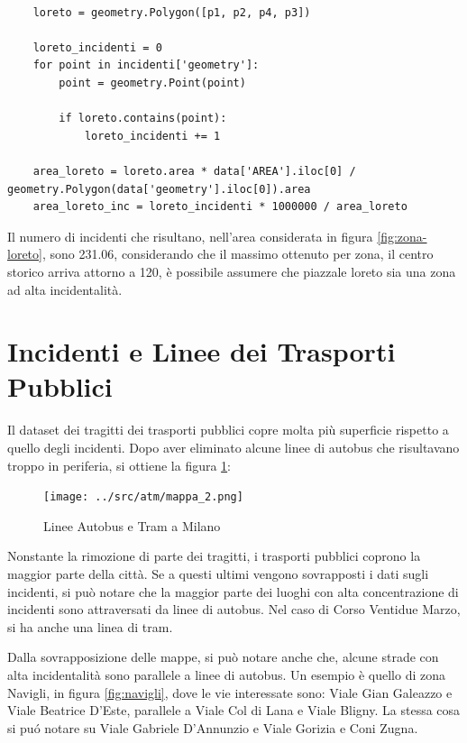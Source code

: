 \documentclass[a4paper]{report}
\begin{document}
\begin{lstlisting}

    loreto = geometry.Polygon([p1, p2, p4, p3])

    loreto_incidenti = 0
    for point in incidenti['geometry']: 
        point = geometry.Point(point)

        if loreto.contains(point): 
            loreto_incidenti += 1

    area_loreto = loreto.area * data['AREA'].iloc[0] / geometry.Polygon(data['geometry'].iloc[0]).area
    area_loreto_inc = loreto_incidenti * 1000000 / area_loreto

\end{lstlisting}

Il numero di incidenti che risultano, nell'area considerata in figura \ref{fig:zona-loreto}, 
sono 231.06, considerando che il massimo ottenuto per zona, il centro storico arriva attorno a 120, 
è possibile assumere che piazzale loreto sia una zona ad alta incidentalità.


\section{Incidenti e Linee dei Trasporti Pubblici}

Il dataset dei tragitti dei trasporti pubblici copre molta più superficie rispetto a 
quello degli incidenti.
Dopo aver eliminato alcune linee di autobus che risultavano troppo in periferia, 
si ottiene la figura \ref{fig:geo-trasporti}: 

\begin{figure}
    \texttt{[image: ../src/atm/mappa\_2.png]}
    \caption{Linee Autobus e Tram a Milano}
    \label{fig:geo-trasporti}
\end{figure}

Nonstante la rimozione di parte dei tragitti, i trasporti pubblici coprono 
la maggior parte della città.
Se a questi ultimi vengono sovrapposti i dati sugli incidenti, 
si può notare che la maggior parte dei luoghi con alta concentrazione di incidenti sono 
attraversati da linee di autobus. Nel caso di Corso Ventidue Marzo, si ha anche una linea di tram.

Dalla sovrapposizione delle mappe, si può notare anche che, alcune strade con alta incidentalità 
sono parallele a linee di autobus. 
Un esempio è quello di zona Navigli, in figura \ref{fig:navigli}, dove le vie interessate sono:
Viale Gian Galeazzo e Viale Beatrice D'Este, parallele a Viale Col di Lana e Viale Bligny.
La stessa cosa si pu\'o notare su Viale Gabriele D'Annunzio e Viale Gorizia e Coni Zugna.
\end{document}
